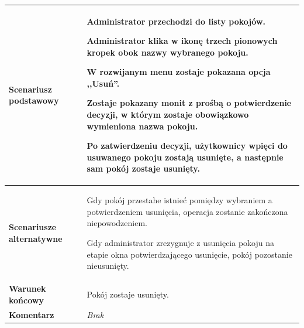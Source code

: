 {\begin{tabular}{ | l | l | }
	\hline
		\textbf{Scenariusz podstawowy} & \parbox[t]{11cm}{
			\begin{enumreq}
				\item Administrator przechodzi do listy pokojów.
				\item Administrator klika w ikonę trzech pionowych kropek obok nazwy
				wybranego pokoju.
				\item W rozwijanym menu zostaje pokazana opcja ,,Usuń''.
				\item Zostaje pokazany monit z prośbą o potwierdzenie decyzji, w którym
				zostaje obowiązkowo wymieniona nazwa pokoju.
				\item Po zatwierdzeniu decyzji, użytkownicy wpięci do usuwanego pokoju
				zostają usunięte, a następnie sam pokój zostaje usunięty.
			\end{enumreq}
		}
		\\

	\hline
		\textbf{Scenariusze alternatywne} & \parbox[t]
		{11cm}{
			\begin{enumreq}
				\item Gdy pokój przestahe istnieć pomiędzy wybraniem a potwierdzeniem
				usunięcia, operacja zostanie zakończona niepowodzeniem.
				\item Gdy administrator zrezygnuje z usunięcia pokoju na etapie okna
				potwierdzającego usunięcie, pokój pozostanie nieusunięty.
			\end{enumreq}
		}
		\\

	\hline
		\textbf{Warunek końcowy} & \parbox[t]{11cm}{
			Pokój zostaje usunięty.
		}
		\\

	\hline
		\textbf{Komentarz} & \parbox[t]{11cm}{
			\textit{Brak}
		}
		\\

	\hline
\end{tabular}
}
